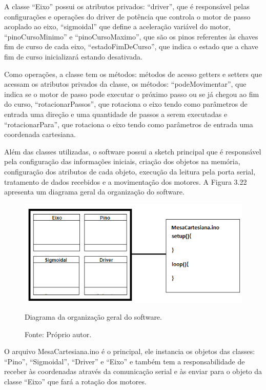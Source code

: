 A classe “Eixo” possui os atributos privados: “driver”, que é responsável pelas configurações e operações 
do driver de potência que controla o motor de passo acoplado ao eixo, “sigmoidal” que define a aceleração 
variável do motor, “pinoCursoMinimo” e “pinoCursoMaximo”, que são os pinos referentes às chaves fim de 
curso de cada eixo, “estadoFimDeCurso”, que indica o estado que a chave fim de curso inicializará estando 
desativada. 

Como operações, a classe tem os métodos: métodos de acesso getters e setters que acessam os atributos 
privados da classe, os métodos: “podeMovimentar”, que indica se o motor de passo pode executar o próximo 
passo ou se já chegou ao fim do curso, “rotacionarPassos”, que rotaciona o eixo tendo como parâmetros de 
entrada uma direção e uma quantidade de passos a serem executadas e “rotacionarPara”, que rotaciona o 
eixo tendo como parâmetros de entrada uma coordenada cartesiana.

Além das classes utilizadas, o software possui a sketch principal que é responsável pela configuração das 
informações iniciais, criação dos objetos na memória, configuração dos atributos de cada objeto, execução 
da leitura pela porta serial, tratamento de dados recebidos e a movimentação dos motores.
A Figura 3.22 apresenta um diagrama geral da organização do software.

\begin{figure}[!htb]
\centering
\includegraphics[scale = 0.85]{figuras/3-22}
\caption{Diagrama da organização geral do software.}
\caption*{Fonte: Próprio autor.}
\label{figorgsoftware}
\end{figure}
    
O arquivo MesaCartesiana.ino é o principal, ele instancia os objetos das classes: “Pino”, “Sigmoidal”, 
“Driver” e “Eixo” e também tem a responsabilidade de receber às coordenadas através da comunicação serial 
e às enviar para o objeto da classe “Eixo” que fará a rotação dos motores.

